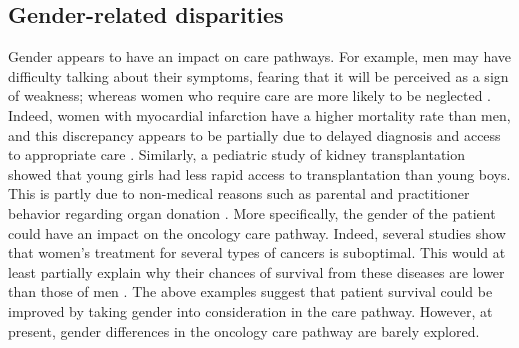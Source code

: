 \subsection*{Gender-related disparities}

Gender appears to have an impact on care pathways. For example, men may have difficulty talking about their symptoms, fearing that it will be perceived as a sign of weakness; whereas women who require care are more likely to be neglected \cite{ferrari_gender_2018}. Indeed, women with myocardial infarction have a higher mortality rate than men, and this discrepancy appears to be partially due to delayed diagnosis and access to appropriate care \cite{bugiardini_delayed_2017}. Similarly, a pediatric study of kidney transplantation showed that young girls had less rapid access to transplantation than young boys. This is partly due to non-medical reasons such as parental and practitioner behavior regarding organ donation \cite{hogan_j_gender_2016}.
More specifically, the gender of the patient could have an impact on the oncology care pathway. Indeed, several studies show that women's treatment for several types of cancers is suboptimal. This would at least partially explain why their chances of survival from these diseases are lower than those of men \cite{park_a_undertreatment_2019,carter_paulson_e_gender_2009,rose_sex_2016}.
The above examples suggest that patient survival could be improved by taking gender into consideration in the care pathway. However, at present, gender differences in the oncology care pathway are barely explored.
